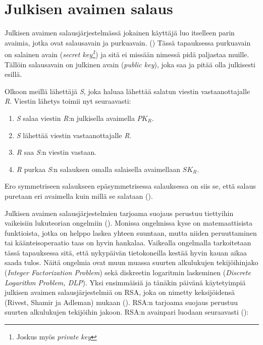  \section{Julkisen avaimen salaus}
 Julkisen avaimen salausjärjestelmässä jokainen käyttäjä luo itselleen parin avaimia, jotka ovat salausavain ja purkuavain. (\cite{bellare2005introduction}) Tässä tapauksessa purkuavain on salainen avain (\emph{secret key\footnote{Joskus myös \emph{private key}}}) ja sitä ei missään nimessä pidä paljastaa muille. Tällöin salausavain on julkinen avain (\emph{public key}), joka saa ja pitää olla julkisesti esillä.
 
 Olkoon meillä lähettäjä \emph{S}, joka haluaa lähettää salatun viestin vastaanottajalle \emph{R}. Viestin lähetys toimii nyt seuraavasti:
 \begin{enumerate}
     \item \emph{S} salaa viestin \emph{R}:n julkisella avaimella $PK_{R}$.
     \item \emph{S} lähettää viestin vastaanottajalle \emph{R}.
     \item \emph{R} saa \emph{S}:n viestin vastaan.
     \item \emph{R} purkaa \emph{S}:n salauksen omalla salaisella avaimellaan $SK_{R}$.
 \end{enumerate}
Ero symmetriseen salaukseen epäsymmetrisessa salauksessa on siis se, että salaus puretaan eri avaimella kuin millä se salataan (\cite{bellare2005introduction}).
 
  Julkisen avaimen salausjärjestelmien tarjoama suojaus perustuu tiettyihin vaikeisiin lukuteorian ongelmiin (\cite{mavroeidis2018impact}). Monissa ongelmissa kyse on matemaattisista funktioista, jotka on helppo laskea yhteen suuntaan, mutta niiden peruuttaminen tai käänteisoperaatio taas on hyvin hankalaa. Vaikealla ongelmalla tarkoitetaan tässä tapauksessa sitä, että nykypäivän tietokoneilla kestää hyvin kauan aikaa saada tulos. Näitä ongelmia ovat muun muassa suurten alkulukujen tekijöihinjako (\emph{Integer Factorization Problem}) sekä diskreetin logaritmin laskeminen (\emph{Discrete Logarithm Problem, DLP}).
  Yksi ensimmäisiä ja tänäkin päivänä käytetyimpiä julkisen avaimen salausjärjestelmiä on RSA, joka on nimetty keksijöidensä (Rivest, Shamir ja Adleman) mukaan (\cite{montgomery1994survey}). RSA:n tarjoama suojaus perustuu suurten alkulukujen tekijöihin jakoon. RSA:n avainpari luodaan seuraavasti  (\cite{10.1145/359340.359342}):
  
